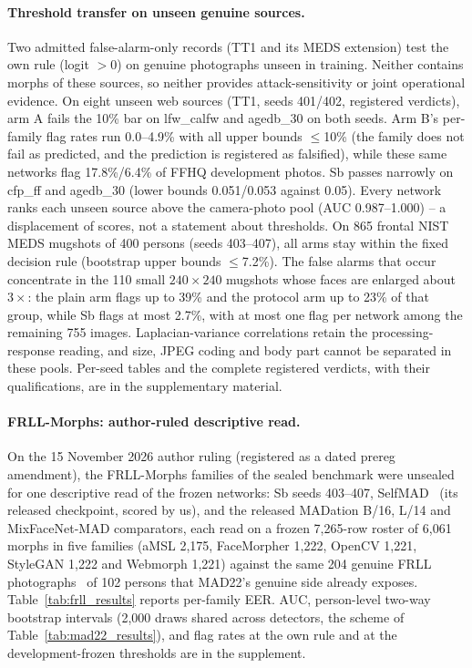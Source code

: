     \paragraph{Threshold transfer on unseen genuine sources.}
    Two admitted false-alarm-only records (TT1 and its MEDS extension) test the own rule (logit $>0$) on genuine photographs unseen in training. Neither contains morphs of these sources, so neither provides attack-sensitivity or joint operational evidence. On eight unseen web sources (TT1, seeds 401/402, registered verdicts), arm A fails the 10\% bar on lfw\_calfw and agedb\_30 on both seeds. Arm B's per-family flag rates run 0.0--4.9\% with all upper bounds $\le$10\% (the family does not fail as predicted, and the prediction is registered as falsified), while these same networks flag 17.8\%/6.4\% of FFHQ development photos. Sb passes narrowly on cfp\_ff and agedb\_30 (lower bounds 0.051/0.053 against 0.05). Every network ranks each unseen source above the camera-photo pool (AUC 0.987--1.000) -- a displacement of scores, not a statement about thresholds. On 865 frontal NIST MEDS mugshots of 400 persons (seeds 403--407), all arms stay within the fixed decision rule (bootstrap upper bounds $\le$7.2\%). The false alarms that occur concentrate in the 110 small $240\times240$ mugshots whose faces are enlarged about $3\times$: the plain arm flags up to 39\% and the protocol arm up to 23\% of that group, while Sb flags at most 2.7\%, with at most one flag per network among the remaining 755 images. Laplacian-variance correlations retain the processing-response reading, and size, JPEG coding and body part cannot be separated in these pools. Per-seed tables and the complete registered verdicts, with their qualifications, are in the supplementary material.
    
    \paragraph{FRLL-Morphs: author-ruled descriptive read.}
    On the 15 November 2026 author ruling (registered as a dated prereg amendment), the FRLL-Morphs families of the sealed benchmark were unsealed for one descriptive read of the frozen networks: Sb seeds 403--407, SelfMAD~\cite{ivanovska2025selfmad} (its released checkpoint, scored by us), and the released MADation B/16, L/14 and MixFaceNet-MAD comparators, each read on a frozen 7,265-row roster of 6,061 morphs in five families (aMSL 2,175, FaceMorpher 1,222, OpenCV 1,221, StyleGAN 1,222 and Webmorph 1,221) against the same 204 genuine FRLL photographs~\cite{debruine2017frll} of 102 persons that MAD22's genuine side already exposes. Table~\ref{tab:frll_results} reports per-family EER. AUC, person-level two-way bootstrap intervals (2,000 draws shared across detectors, the scheme of Table~\ref{tab:mad22_results}), and flag rates at the own rule and at the development-frozen thresholds are in the supplement.
    
